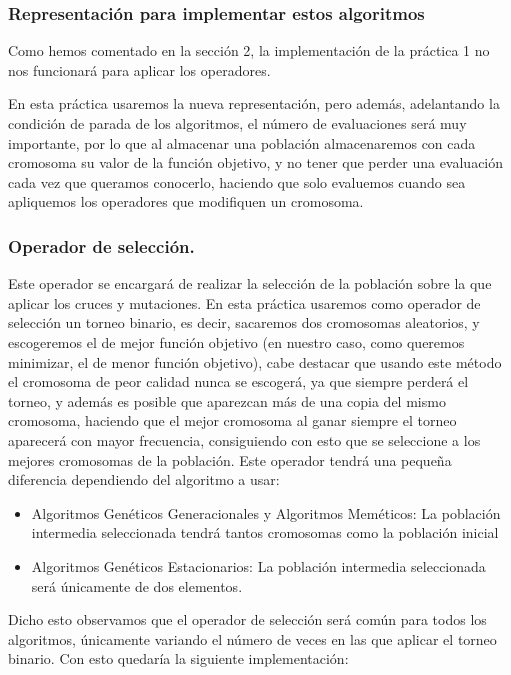 \documentclass[12pt, spanish]{article}
\begin{document}
\subsubsection{Representación para implementar estos algoritmos}

Como hemos comentado en la sección 2, la implementación de la práctica 1 no nos funcionará para aplicar los operadores.

En esta práctica usaremos la nueva representación, pero además, adelantando la condición de parada de los algoritmos, el número de evaluaciones será muy importante, por lo que al almacenar una población almacenaremos con cada cromosoma su valor de la función objetivo, y no tener que perder una evaluación cada vez que queramos conocerlo, haciendo que solo evaluemos cuando sea apliquemos los operadores que modifiquen un cromosoma.

\subsubsection{Operador de selección.}

Este operador se encargará de realizar la selección de la población sobre la que aplicar los cruces y mutaciones. En esta práctica usaremos como operador de selección un torneo binario, es decir, sacaremos dos cromosomas aleatorios, y escogeremos el de mejor función objetivo (en nuestro caso, como queremos minimizar, el de menor función objetivo), cabe destacar que usando este método el cromosoma de peor calidad nunca se escogerá, ya que siempre perderá el torneo, y además es posible que aparezcan más de una copia del mismo cromosoma, haciendo que el mejor cromosoma al ganar siempre el torneo aparecerá con mayor frecuencia, consiguiendo con esto que se seleccione a los mejores cromosomas de la población. Este operador tendrá una pequeña diferencia dependiendo del algoritmo a usar:

\begin{itemize}
	\item Algoritmos Genéticos Generacionales y Algoritmos Meméticos: La población intermedia seleccionada tendrá tantos cromosomas como la población inicial
	\item Algoritmos Genéticos Estacionarios: La población intermedia seleccionada será únicamente de dos elementos.
\end{itemize}

Dicho esto observamos que el operador de selección será común para todos los algoritmos, únicamente variando el número de veces en las que aplicar el torneo binario. Con esto quedaría la siguiente implementación:
\end{document}
